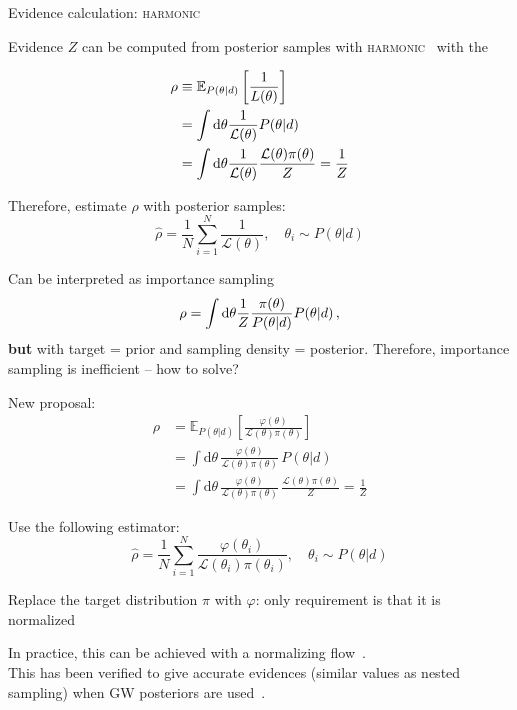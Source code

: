 \documentclass[usenames,dvipsnames,t]{beamer}
\begin{document}
\begin{frame}[allowframebreaks]{Evidence calculation: \textsc{harmonic}}

  Evidence $Z$ can be computed from posterior samples with \textsc{harmonic}~\cite{mcewen2023machinelearningassistedbayesian} with the 

  \begin{align*}
    \rho &\equiv \mathbb{E}_{P(\theta|d)}\left[\frac{1}{L(\theta)}\right] \\ 
    &= \int \mathop{}\!\mathrm{d} \theta \frac{1}{\mathcal{L}(\theta)} P(\theta | d) \\
    &= \int \mathop{}\!\mathrm{d} \theta \frac{1}{\mathcal{L}(\theta)} \frac{\mathcal{L}(\theta) \pi(\theta)}{Z} = \frac{1}{Z}
  \end{align*}

  Therefore, estimate $\rho$ with posterior samples:
  \begin{equation*}
    \hat{\rho} = \frac1N \sum_{i=1}^N \frac{1}{\mathcal{L}(\theta)}, \quad \theta_i \sim P(\theta|d)
  \end{equation*}

  Can be interpreted as importance sampling
  \begin{equation*}
    \rho = \int \mathop{}\!\mathrm{d} \theta \frac1Z \frac{\pi(\theta)}{P(\theta | d)} P(\theta | d) \, ,
  \end{equation*}
  \textbf{but} with target = prior and sampling density = posterior. Therefore, importance sampling is inefficient -- how to solve?

  New proposal:
  \begin{align*}
    \rho &= \mathbb{E}_{P(\theta| d)}\left[ \frac{\varphi(\theta)}{\mathcal{L}(\theta)\pi(\theta)} \right] \\
    &= \int \mathrm{d}\theta \, \frac{\varphi(\theta)}{\mathcal{L}(\theta)\pi(\theta)} \, P(\theta| d) \\
    &= \int \mathrm{d}\theta \, \frac{\varphi(\theta)}{\mathcal{L}(\theta)\pi(\theta)} \, \frac{\mathcal{L}(\theta)\pi(\theta)}{Z} = \frac{1}{Z}
  \end{align*}

  Use the following estimator:
  \begin{equation*}
    \hat{\rho} = \frac{1}{N} \sum_{i=1}^N \frac{\varphi(\theta_i)}{\mathcal{L}(\theta_i)\pi(\theta_i)}, \quad \theta_i \sim P(\theta|d)
  \end{equation*}

  \vspace{5mm}
  Replace the target distribution $\pi$ with $\varphi$: only requirement is that it is normalized 
  
  \vspace{5mm}
  In practice, this can be achieved with a normalizing flow~\cite{polanska2024learnedharmonicmeanestimation}. \\
  
  \vspace{5mm}
  This has been verified to give accurate evidences (similar values as nested sampling) when GW posteriors are used~\cite{Polanska:2024zpn}. 
\end{frame}
\end{document}
